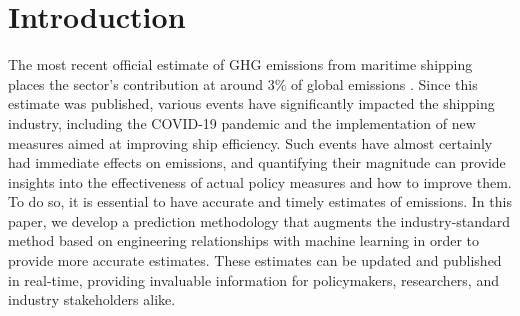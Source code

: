 \section{Introduction}\label{MLintro}

The most recent official estimate of \ac{GHG} emissions from maritime shipping places the sector's contribution at around 3\% of global emissions \parencite{faber2020fourth}. Since this estimate was published, various events have significantly impacted the shipping industry, including the COVID-19 pandemic and the implementation of new measures aimed at improving ship efficiency. Such events have almost certainly had immediate effects on emissions, and quantifying their magnitude can provide insights into the effectiveness of actual policy measures and how to improve them. To do so, it is essential to have accurate and timely estimates of emissions. In this paper, we develop a prediction methodology that augments the industry-standard method based on engineering relationships with machine learning in order to provide more accurate estimates. These estimates can be updated and published in real-time, providing invaluable information for policymakers, researchers, and industry stakeholders alike.


